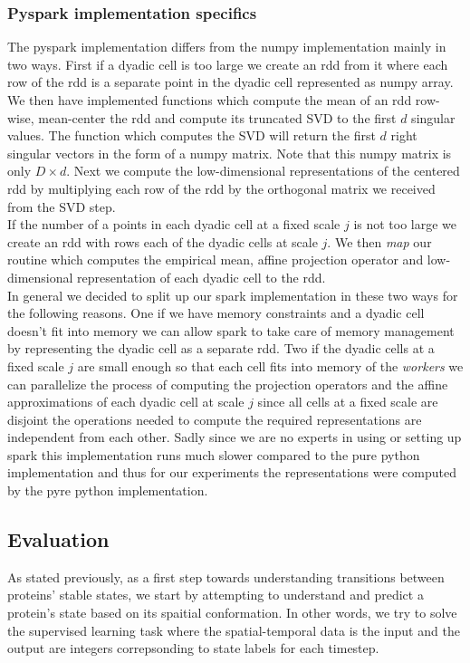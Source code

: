 \documentclass{article}
\begin{document}
  \subsubsection{Pyspark implementation specifics}
  The pyspark implementation differs from the numpy implementation mainly in two ways. First if a dyadic cell is too large we create an rdd from it where each row of the rdd is a separate point in the dyadic cell represented as numpy array. We then have implemented functions which compute the mean of an rdd row-wise, mean-center the rdd and compute its truncated SVD to the first $d$ singular values. The function which computes the SVD will return the first $d$ right singular vectors in the form of a numpy matrix. Note that this numpy matrix is only $D\times d$. Next we compute the low-dimensional representations of the centered rdd by multiplying each row of the rdd by the orthogonal matrix we received from the SVD step.\\
  If the number of a points in each dyadic cell at a fixed scale $j$ is not too large we create an rdd with rows each of the dyadic cells at scale $j$. We then \textit{map} our routine which computes the empirical mean, affine projection operator and low-dimensional representation of each dyadic cell to the rdd.\\
  In general we decided to split up our spark implementation in these two ways for the following reasons. One if we have memory constraints and a dyadic cell doesn't fit into memory we can allow spark to take care of memory management by representing the dyadic cell as a separate rdd. Two if the dyadic cells at a fixed scale $j$ are small enough so that each cell fits into memory of the \textit{workers} we can parallelize the process of computing the projection operators and the affine approximations of each dyadic cell at scale $j$ since all cells at a fixed scale are disjoint the operations needed to compute the required representations are independent from each other. Sadly since we are no experts in using or setting up spark this implementation runs much slower compared to the pure python implementation and thus for our experiments the representations were computed by the pyre python implementation.

\subsection{Evaluation}

	As stated previously, as a first step towards understanding transitions between proteins' stable states, we start by attempting to understand and predict a protein's state based on its spaitial conformation. In other words, we try to solve the supervised learning task where the spatial-temporal data is the input and the output are integers correpsonding to state labels for each timestep.
	
\end{document}
